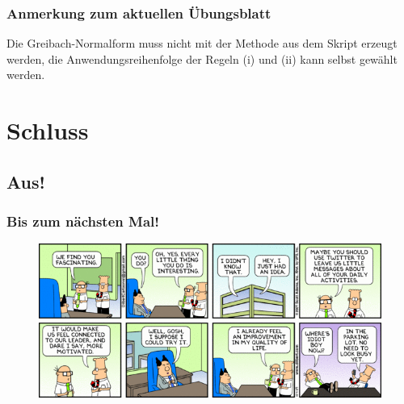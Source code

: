 \begin{frame}
 \frametitle{Anmerkung zum aktuellen Übungsblatt}
 Die Greibach-Normalform muss nicht mit der Methode aus dem Skript erzeugt werden,
 die Anwendungsreihenfolge der Regeln (i) und (ii) kann selbst gewählt werden.
\end{frame}

\section{Schluss}
\subsection{Aus!}
\begin{frame}
\frametitle{Bis zum nächsten Mal!}
	\begin{figure}[H]
		\includegraphics[width= \textwidth]{images/dilbert-69231}
	\end{figure}
\end{frame}



